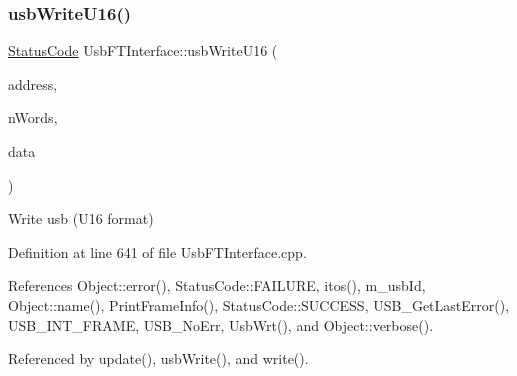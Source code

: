 \subsubsection{\texorpdfstring{usb\+Write\+U16()}{usbWriteU16()}}
{\footnotesize\ttfamily \hyperlink{classStatusCode}{Status\+Code} Usb\+F\+T\+Interface\+::usb\+Write\+U16 (\begin{DoxyParamCaption}\item[{unsigned long int}]{address,  }\item[{unsigned long int}]{n\+Words,  }\item[{unsigned short $\ast$}]{data }\end{DoxyParamCaption})}

Write usb (U16 format) 

Definition at line 641 of file Usb\+F\+T\+Interface.\+cpp.



References Object\+::error(), Status\+Code\+::\+F\+A\+I\+L\+U\+RE, itos(), m\+\_\+usb\+Id, Object\+::name(), Print\+Frame\+Info(), Status\+Code\+::\+S\+U\+C\+C\+E\+SS, U\+S\+B\+\_\+\+Get\+Last\+Error(), U\+S\+B\+\_\+\+I\+N\+T\+\_\+\+F\+R\+A\+ME, U\+S\+B\+\_\+\+No\+Err, Usb\+Wrt(), and Object\+::verbose().



Referenced by update(), usb\+Write(), and write().


